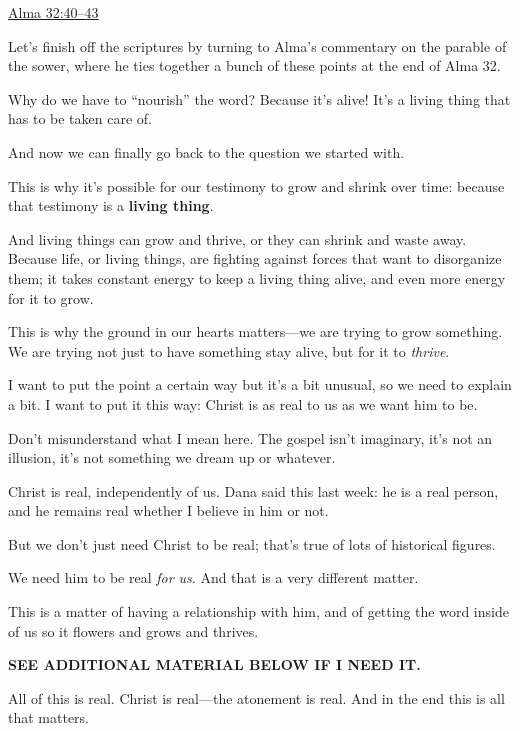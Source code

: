 \begin{compactitem}
\begin{compactitem}
\begin{compactitem}
						\end{compactitem}
					\item \hyperref[ALMA-32-40]{Alma 32:40--43}
						\begin{compactitem}
							\item Let's finish off the scriptures by turning to Alma's commentary on the parable of the sower, where he ties together a bunch of these points at the end of Alma 32.
							\item Why do we have to ``nourish'' the word? Because it's alive! It's a living thing that has to be taken care of.
							\item And now we can finally go back to the question we started with.
							\item This is why it's possible for our testimony to grow and shrink over time: because that testimony is a \textbf{living thing}.
							\item And living things can grow and thrive, or they can shrink and waste away. Because life, or living things, are fighting against forces that want to disorganize them; it takes constant energy to keep a living thing alive, and even more energy for it to grow.
							\item This is why the ground in our hearts matters---we are trying to grow something. We are trying not just to have something stay alive, but for it to \textit{thrive}.
						\end{compactitem}
				\end{compactitem}
				
			\item I want to put the point a certain way but it's a bit unusual, so we need to explain a bit. I want to put it this way: Christ is as real to us as we want him to be.
				\begin{compactitem}
					\item Don't misunderstand what I mean here. The gospel isn't imaginary, it's not an illusion, it's not something we dream up or whatever.
					\item Christ is real, independently of us. Dana said this last week: he is a real person, and he remains real whether I believe in him or not.
					\item But we don't just need Christ to be real; that's true of lots of historical figures.
					\item We need him to be real \textit{for us}. And that is a very different matter.
					\item This is a matter of having a relationship with him, and of getting the word inside of us so it flowers and grows and thrives.
					\item \textbf{SEE ADDITIONAL MATERIAL BELOW IF I NEED IT.}
					\item All of this is real. Christ is real---the atonement is real. And in the end this is all that matters. 
				\end{compactitem}
				

\end{compactitem}
